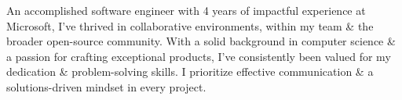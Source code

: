 
\begin{cvparagraph}
An accomplished software engineer with 4 years of impactful experience at Microsoft,
I've thrived in collaborative environments, within my team \& the broader
open-source community. With a solid background in computer science \& a passion
for crafting exceptional products, I've consistently been valued for my dedication
\& problem-solving skills. I prioritize effective communication \& a solutions-driven
mindset in every project.
\end{cvparagraph}
